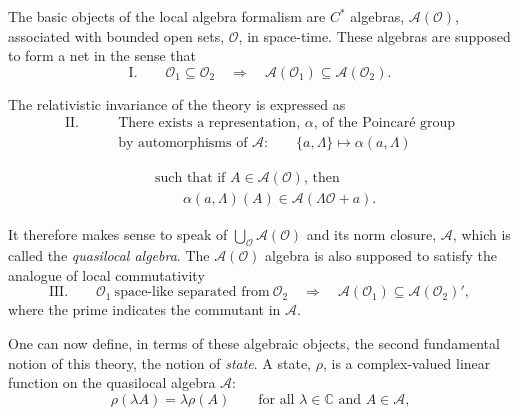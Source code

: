 The basic objects of the local algebra formalism are $C^*$ algebras,
$\mathcal A(\mathcal O)$, associated with bounded open sets, $\mathcal O$, in
space-time.  These algebras are supposed to form a net in the sense that
\begin{equation*}
  \mathrm{I.}\qquad
  \mathcal O_1\subseteq\mathcal O_2
  \quad\Longrightarrow\quad
  \mathcal A(\mathcal O_1)\subseteq\mathcal A(\mathcal O_2).
\end{equation*}

The relativistic invariance of the theory is expressed as
\begin{equation*}
  \begin{aligned}
    \mathrm{II.}\qquad
    &\text{There exists a representation, $\alpha$, of the Poincar\'e group}\\
    &\text{by automorphisms of $\mathcal A$:}\qquad
      \{a,\Lambda\}\longmapsto\alpha(a,\Lambda)
  \end{aligned}
\end{equation*}

\begin{equation*}
  \begin{aligned}
    &\text{such that if $A\in\mathcal A(\mathcal O)$, then}\\
    &\qquad\alpha(a,\Lambda)(A)\in\mathcal A(\Lambda\mathcal O+a).
  \end{aligned}
\end{equation*}

It therefore makes sense to speak of $\bigcup_{\mathcal O}\mathcal A(\mathcal
O)$ and its norm closure, $\mathcal A$, which is called the
\emph{quasilocal algebra}.  The $\mathcal A(\mathcal O)$ algebra is also
supposed to satisfy the analogue of local commutativity
\begin{equation*}
  \mathrm{III.}\qquad
  \mathcal O_1\ \text{space-like separated from}\ \mathcal O_2
  \quad\Longrightarrow\quad
  \mathcal A(\mathcal O_1)\subseteq\mathcal A(\mathcal O_2)',
\end{equation*}
where the prime indicates the commutant in $\mathcal A$.

One can now define, in terms of these algebraic objects, the second
fundamental notion of this theory, the notion of \emph{state}.  A state, $\rho$,
is a complex-valued linear function on the quasilocal algebra $\mathcal A$:
\begin{equation*}
  \rho(\lambda A)=\lambda\rho(A)
  \qquad\text{for all $\lambda\in\mathbb C$ and $A\in\mathcal A$,}
\end{equation*}

